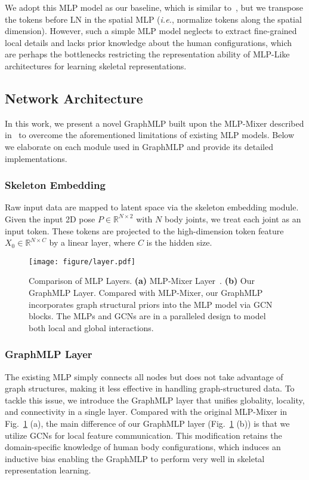 \documentclass[lettersize,journal]{IEEEtran}
\begin{document}
We adopt this MLP model as our baseline, which is similar to~\cite{mlpmixer}, but we transpose the tokens before LN in the spatial MLP (\emph{i.e.}, normalize tokens along the spatial dimension). 
However, such a simple MLP model neglects to extract fine-grained local details and lacks prior knowledge about the human configurations, which are perhaps the bottlenecks restricting the representation ability of MLP-Like architectures for learning skeletal representations. 

\subsection{Network Architecture}
In this work, we present a novel GraphMLP built upon the MLP-Mixer described in~\cite{mlpmixer} to overcome the aforementioned limitations of existing MLP models. 
Below we elaborate on each module used in GraphMLP and provide its detailed implementations. 

\subsubsection{Skeleton Embedding}
Raw input data are mapped to latent space via the skeleton embedding module. 
Given the input 2D pose $P \in \mathbb{R}^{N \times 2}$ with $N$ body joints, we treat each joint as an input token. 
These tokens are projected to the high-dimension token feature $X_{0} \in \mathbb{R}^{N \times C}$ by a linear layer, where $C$ is the hidden size. 

\begin{figure}[tb]
  \centering
  \texttt{[image: figure/layer.pdf]}
  \caption
  {
    Comparison of MLP Layers. 
    \textbf{(a)} MLP-Mixer Layer~\cite{mlpmixer}. 
    \textbf{(b)} Our GraphMLP Layer.
    Compared with MLP-Mixer, our GraphMLP incorporates graph structural priors into the MLP model via GCN blocks. 
    The MLPs and GCNs are in a paralleled design to model both local and global interactions. 
  }
  \label{fig:layer}
\end{figure}

\subsubsection{GraphMLP Layer}
The existing MLP simply connects all nodes but does not take advantage of graph structures, making it less effective in handling graph-structured data. 
To tackle this issue, we introduce the GraphMLP layer that unifies globality, locality, and connectivity in a single layer. 
Compared with the original MLP-Mixer in Fig.~\ref{fig:layer} (a), the main difference of our GraphMLP layer (Fig.~\ref{fig:layer} (b)) is that we utilize GCNs for local feature communication. 
This modification retains the domain-specific knowledge of human body configurations, which induces an inductive bias enabling the GraphMLP to perform very well in skeletal representation learning. 
\end{document}
